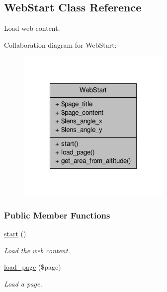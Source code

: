 \hypertarget{classWebStart}{\subsection{Web\-Start Class Reference}
\label{classWebStart}
}


Load web content.  




Collaboration diagram for Web\-Start\-:\nopagebreak
\begin{figure}[H]
\begin{center}
\leavevmode
\includegraphics[width=210pt]{classWebStart__coll__graph}
\end{center}
\end{figure}
\subsubsection*{Public Member Functions}
\begin{DoxyCompactItemize}
\item 
\hypertarget{classWebStart_aab27910ba1dac86454076c3eb1bbfeef}{\hyperlink{classWebStart_aab27910ba1dac86454076c3eb1bbfeef}{start} ()}\label{classWebStart_aab27910ba1dac86454076c3eb1bbfeef}

\begin{DoxyCompactList}\small\item\em Load the web content. \end{DoxyCompactList}\item 
\hyperlink{classWebStart_aa86bafc7079b85cdd1051eeb392525b0}{load\-\_\-page} (\$page)
\begin{DoxyCompactList}\small\item\em Load a page. \end{DoxyCompactList}\end{DoxyCompactItemize}
